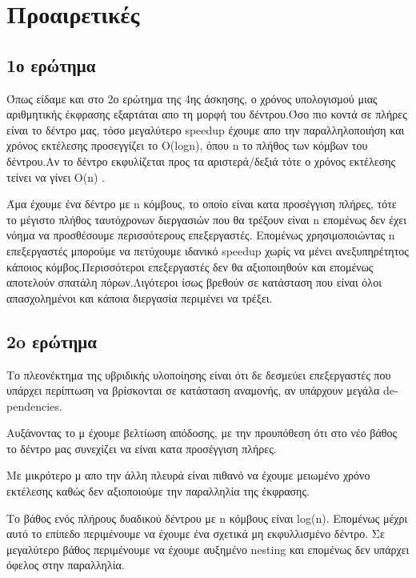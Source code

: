\documentclass[12pt]{article}
\begin{document}
\section*{Προαιρετικές}

\subsection*{1ο ερώτημα}

Όπως είδαμε και στο 2ο ερώτημα της 4ης άσκησης, ο χρόνος υπολογισμού μιας αριθμητικής έκφρασης εξαρτάται απο τη μορφή του δέντρου.Όσο πιο κοντά σε πλήρες είναι το δέντρο μας, τόσο μεγαλύτερο \textlatin{speedup} έχουμε απο την παραλληλοποιήση και χρόνος εκτέλεσης προσεγγίζει το \textlatin{O(logn)}, όπου \textlatin{n} το πλήθος των κόμβων του δέντρου.Αν το δέντρο εκφυλίζεται προς τα αριστερά/δεξιά τότε ο χρόνος εκτέλεσης τείνει να γίνει \textlatin{O(n)} .

 Άμα έχουμε ένα δέντρο με \textlatin{n} κόμβους, το οποίο είναι κατα προσέγγιση πλήρες, τότε το μέγιστο πλήθος ταυτόχρονων διεργασιών που θα τρέξουν είναι \textlatin{n} επομένως δεν έχει νόημα να προσθέσουμε περισσότερους επεξεργαστές. Επομένως χρησιμοποιώντας \textlatin{n} επεξεργαστές μπορούμε να πετύχουμε ιδανικό \textlatin{speedup} χωρίς να μένει ανεξυπηρέτητος κάποιος κόμβος.Περισσότεροι επεξεργαστές δεν θα αξιοποιηθούν και επομένως αποτελούν σπατάλη πόρων.Λιγότεροι ίσως βρεθούν σε κατάσταση που είναι όλοι απασχολημένοι και κάποια διεργασία περιμένει να τρέξει.
 

 
 \subsection*{2o ερώτημα}
 
 Το πλεονέκτημα της υβριδικής υλοποίησης είναι ότι δε δεσμεύει επεξεργαστές που υπάρχει περίπτωση να βρίσκονται σε κατάσταση αναμονής, αν υπάρχουν μεγάλα \textlatin{dependencies}.
 
 Αυξάνοντας το μ έχουμε βελτίωση απόδοσης, με την προυπόθεση ότι στο νέο βάθος το δέντρο μας συνεχίζει να είναι κατα προσέγγιση πλήρες.
 
 Με μικρότερο μ απο την άλλη πλευρά είναι πιθανό να έχουμε μειωμένο χρόνο εκτέλεσης καθώς δεν αξιοποιούμε την παραλληλία της έκφρασης.
 
 Το βάθος ενός πλήρους δυαδικού δέντρου με \textlatin{n} κόμβους είναι \textlatin{log(n)}. Επομένως μέχρι αυτό το επίπεδο περιμένουμε να έχουμε ένα σχετικά μη εκφυλλισμένο δέντρο. Σε μεγαλύτερο βάθος περιμένουμε να έχουμε αυξημένο \textlatin{nesting} και επομένως δεν υπάρχει όφελος στην παραλληλία.
\end{document}
